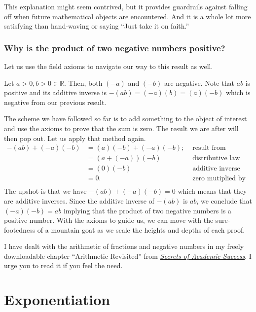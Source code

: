 \documentclass[
  a4paper,
]{article}
\begin{document}
This explanation might seem contrived, but it provides guardrails
against falling off when future mathematical objects are encountered.
And it is a whole lot more satisfying than hand-waving or saying ``Just
take it on faith.''

\hypertarget{why-is-the-product-of-two-negative-numbers-positive}{%
\subsubsection{Why is the product of two negative numbers
positive?}\label{why-is-the-product-of-two-negative-numbers-positive}}

Let us use the field axioms to navigate our way to this result as well.

Let \(a > 0, b > 0 \in \mathbb{R}\). Then, both \((-a)\) and \((-b)\)
are negative. Note that \(ab\) is positive and its additive inverse is
\(-(ab) = (-a)(b) = (a)(-b)\) which is negative from our previous
result.

The scheme we have followed so far is to add something to the object of
interest and use the axioms to prove that the sum is zero. The result we
are after will then pop out. Let us apply that method again. \[
\begin{aligned}
-(ab) + (-a)(-b) &= (a)(-b) + (-a)(-b); & \mbox{ result from previous section}\\
&= (a + (-a))(-b) & \mbox{ distributive law}\\
&= (0)(-b) & \mbox{ additive inverse}\\
&= 0. & \mbox{ zero mutiplied by anything is zero}\\
\end{aligned}
\] The upshot is that we have \(-(ab) + (-a)(-b) = 0\) which means that
they are additive inverses. Since the additive inverse of \(-(ab)\) is
\(ab\), we conclude that \((-a)(-b) = ab\) implying that the product of
two negative numbers is a positive number. With the axioms to guide us,
we can move with the sure-footedness of a mountain goat as we scale the
heights and depths of each proof.

I have dealt with the arithmetic of fractions and negative numbers in my
freely downloadable chapter ``Arithmetic Revisited'' from
\href{https://swanlotus.netlify.app/sas-manuscript/SAS-partial.pdf}{\emph{Secrets
of Academic Success}}. I urge you to read it if you feel the need.

\hypertarget{exponentiation}{%
\section{Exponentiation}\label{exponentiation}}
\end{document}
